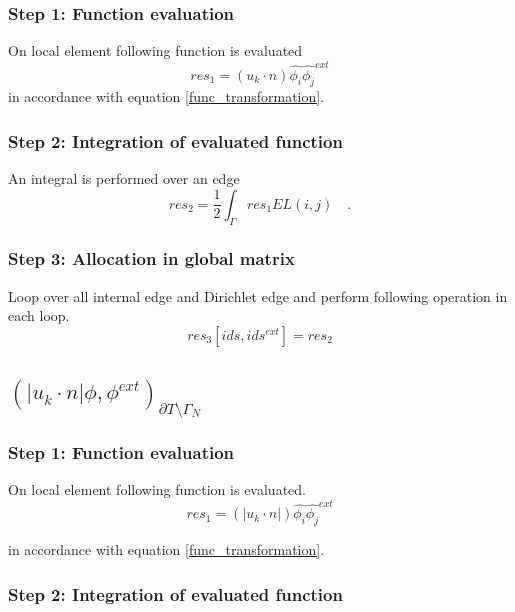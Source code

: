 \documentclass[a4paper,openany]{book}
\begin{document}
\subsubsection{Step 1: Function evaluation}

On local element following function is evaluated 
\begin{equation}
res_1  = (u_k \cdot n) \hat{\phi_i} \hat{\phi_j}^{ext} 
\end{equation}
in accordance with equation \ref{func_transformation}.

\subsubsection{Step 2: Integration of evaluated function}

An integral is performed over an edge
\begin{equation}
res_2 = \frac{1}{2} \int_{\Gamma} res_1 EL(i,j) \quad \textrm{.}
\end{equation}

\subsubsection{Step 3: Allocation in global matrix}

Loop over all internal edge and Dirichlet edge and perform following operation in each loop.
\begin{equation}
res_3[ids,ids^{ext}] = res_2
\end{equation}

\subsection{$(|u_k \cdot n| \phi,\phi^{ext})_{\partial T \setminus \Gamma_N}$} 

\subsubsection{Step 1: Function evaluation}

On local element following function is evaluated.
\begin{equation}
res_1 = (|u_k \cdot n|) \hat{\phi_i} \hat{\phi_j}^{ext} 
\end{equation}

in accordance with equation \ref{func_transformation}.\\

\subsubsection{Step 2: Integration of evaluated function}
\end{document}
